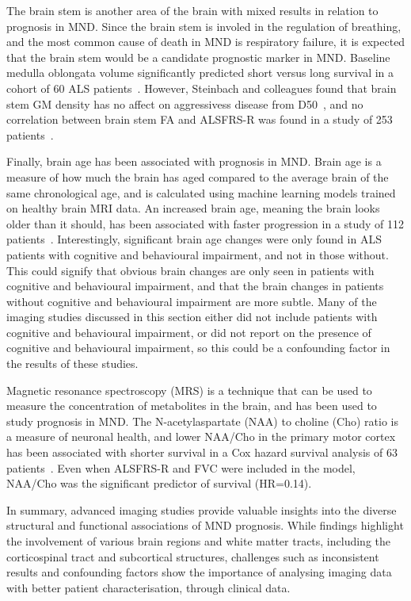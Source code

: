 The brain stem is another area of the brain with mixed results in relation to prognosis in MND.
Since the brain stem is involed in the regulation of breathing, and the most common cause of death in MND is respiratory failure, it is expected that the brain stem would be a candidate prognostic marker in MND.
Baseline medulla oblongata volume significantly predicted short versus long survival in a cohort of 60 ALS patients~\cite{milellaMedullaOblongataVolume2022}.
However, Steinbach and colleagues found that brain stem GM density has no affect on aggressivess disease from D50~\cite{steinbachApplyingD50Disease2020}, and no correlation between brain stem FA and ALSFRS-R was found in a study of 253 patients~\cite{mullerLargescaleMulticentreCerebral2016}.

Finally, brain age has been associated with prognosis in MND. Brain age is a measure of how much the brain has aged compared to the average brain of the same chronological age, and is calculated using machine learning models trained on healthy brain MRI data.
An increased brain age, meaning the brain looks older than it should, has been associated with faster progression in a study of 112 patients~\cite{hermannCognitiveBehaviouralNot2022}.
Interestingly, significant brain age changes were only found in ALS patients with cognitive and behavioural impairment, and not in those without. This could signify that obvious brain changes are only seen in patients with cognitive and behavioural impairment, and that the brain changes in patients without cognitive and behavioural impairment are more subtle.
Many of the imaging studies discussed in this section either did not include patients with cognitive and behavioural impairment, or did not report on the presence of cognitive and behavioural impairment, so this could be a confounding factor in the results of these studies.

Magnetic resonance spectroscopy (MRS) is a technique that can be used to measure the concentration of metabolites in the brain, and has been used to study prognosis in MND.
The N-acetylaspartate (NAA) to choline (Cho) ratio is a measure of neuronal health, and lower NAA/Cho in the primary motor cortex has been associated with shorter survival in a Cox hazard survival analysis of 63 patients~\cite{kalraCerebralDegenerationPredicts2006}.
Even when ALSFRS-R and FVC were included in the model, NAA/Cho was the significant predictor of survival (HR=0.14).

In summary, advanced imaging studies provide valuable insights into the diverse structural and functional associations of MND prognosis.
While findings highlight the involvement of various brain regions and white matter tracts, including the corticospinal tract and subcortical structures, challenges such as inconsistent results and confounding factors show the importance of analysing imaging data with better patient characterisation, through clinical data.

